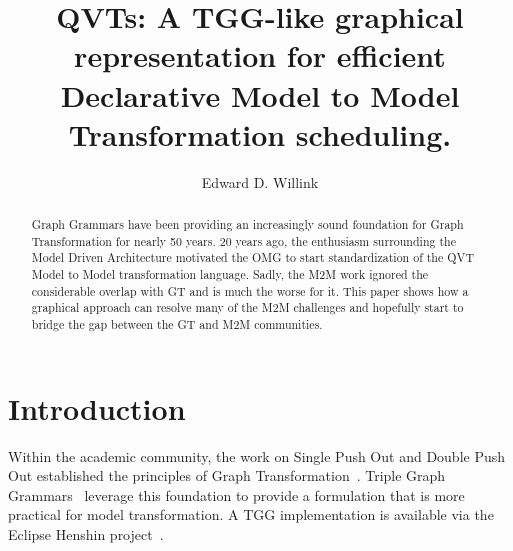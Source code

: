 \documentclass{llncs}
\begin{document}
%
\frontmatter          %
%
%
%
\title{QVTs: A TGG-like graphical representation for efficient Declarative Model to Model Transformation scheduling.}
%
%
\author{Edward D. Willink}
%
%
%

\maketitle              %

\begin{abstract}
Graph Grammars have been providing an increasingly sound foundation for Graph Transformation for nearly 50 years. 20 years ago, the enthusiasm surrounding the Model Driven Architecture motivated the OMG to start standardization of the QVT Model to Model transformation language. Sadly, the M2M work ignored the considerable overlap with GT and is much the worse for it. This paper shows how a graphical approach can resolve many of the M2M challenges and hopefully start to bridge the gap between the GT and M2M communities. 
\end{abstract}
%

\section{Introduction}

Within the academic community, the work on Single Push Out and Double Push Out established the principles of Graph Transformation~\cite{GT}. Triple Graph Grammars~\cite{TGG} leverage this foundation to provide a formulation that is more practical for model transformation. A TGG implementation is available via the Eclipse Henshin project~\cite{Eclipse-Henshin}.
\end{document}
